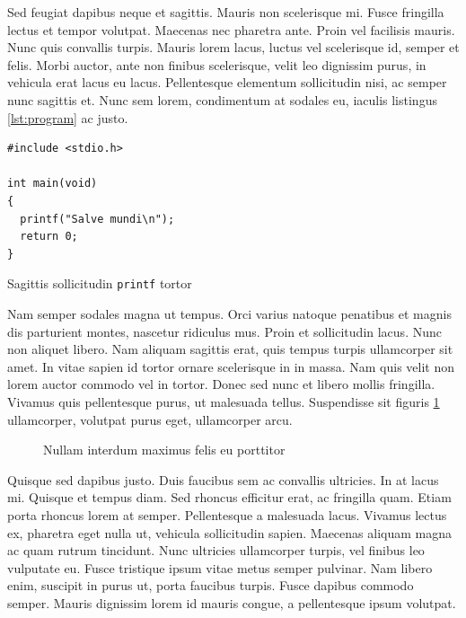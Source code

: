 \documentclass[polish,engineering]{wizthesis}
\begin{document}
Sed feugiat dapibus neque et sagittis. Mauris non scelerisque mi. Fusce
fringilla lectus et tempor volutpat. Maecenas nec pharetra ante. Proin vel
facilisis mauris. Nunc quis convallis turpis. Mauris lorem lacus, luctus vel
scelerisque id, semper et felis. Morbi auctor, ante non finibus scelerisque,
velit leo dignissim purus, in vehicula erat lacus eu lacus. Pellentesque
elementum sollicitudin nisi, ac semper nunc sagittis et. Nunc sem lorem,
condimentum at sodales eu, iaculis listingus \ref{lst:program} ac justo.
\begin{listing}[H]
  \begin{verbatim}
#include <stdio.h>

int main(void)
{
  printf("Salve mundi\n");
  return 0;
}
  \end{verbatim}
  \caption{Sagittis sollicitudin \texttt{printf} tortor}
  \label{lst:program}
\end{listing}

Nam semper sodales magna ut tempus. Orci varius natoque penatibus et magnis dis
parturient montes, nascetur ridiculus mus. Proin et sollicitudin lacus. Nunc non
aliquet libero. Nam aliquam sagittis erat, quis tempus turpis ullamcorper sit
amet. In vitae sapien id tortor ornare scelerisque in in massa. Nam quis velit
non lorem auctor commodo vel in tortor. Donec sed nunc et libero mollis
fringilla. Vivamus quis pellentesque purus, ut malesuada tellus. Suspendisse sit
figuris \ref{fig:wykres} ullamcorper, volutpat purus eget, ullamcorper arcu.
\begin{figure}[ht]
  \centering
  
  \caption{Nullam interdum maximus felis eu porttitor}
  \label{fig:wykres}
\end{figure}
Quisque sed dapibus justo. Duis faucibus sem ac convallis ultricies. In at lacus
mi. Quisque et tempus diam. Sed rhoncus efficitur erat, ac fringilla quam. Etiam
porta rhoncus lorem at semper. Pellentesque a malesuada lacus. Vivamus lectus
ex, pharetra eget nulla ut, vehicula sollicitudin sapien. Maecenas aliquam magna
ac quam rutrum tincidunt. Nunc ultricies ullamcorper turpis, vel finibus leo
vulputate eu. Fusce tristique ipsum vitae metus semper pulvinar. Nam libero
enim, suscipit in purus ut, porta faucibus turpis. Fusce dapibus commodo semper.
Mauris dignissim lorem id mauris congue, a pellentesque ipsum volutpat.
\end{document}

